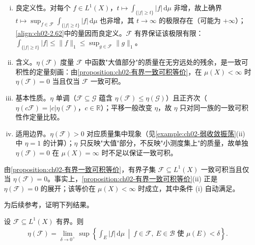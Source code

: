 \documentclass[../../main.tex]{subfiles}%
\begin{document}
\begin{remark}\label{remark:ch02-一致可积模}
\begin{enumerate}[(i)]
\item 良定义性。对每个 $f\in L^1(X)$，$t\mapsto\int_{\{|f|\geqslant t\}}|f|\,\mathrm{d}\mu$ 非增，故上确界 $t\mapsto\sup_{f\in\mathscr F}\int_{\{|f|\geqslant t\}}|f|\,\mathrm{d}\mu$ 也非增，其 $t\to\infty$ 的极限存在（可能为 $+\infty$）；\eqref{align:ch02-2.62}中的量因而良定义。$\mathscr F$ 有界保证该极限有限：$\int_{\{|f|\geqslant t\}}|f|\leqslant\|f\|_1\leqslant\sup_{g\in\mathscr F}\|g\|_1$。
\item 含义。$\eta(\mathscr F)$ 度量 $\mathscr F$ 中函数"大值部分"的质量在无穷远处的残余，是一致可积性的定量刻画：由\cref{proposition:ch02-有界一致可积等价}，在 $\mu(X)<\infty$ 时 $\eta(\mathscr F)=0$ 当且仅当 $\mathscr F$ 一致可积。
\item 基本性质。$\eta$ 单调（$\mathscr F\subseteq\mathscr G$ 蕴含 $\eta(\mathscr F)\leqslant\eta(\mathscr G)$）且正齐次（$\eta(c\mathscr F)=|c|\eta(\mathscr F)$，$c\in\mathbb R$）；平移一般改变 $\eta$，故 $\eta$ 只对同一族的一致可积性作定量比较。
\item 适用边界。$\eta(\mathscr F)>0$ 对应质量集中现象（见\cref{example:ch02-弱收敛振荡}(ii) 中 $\eta=1$ 的计算）；$\eta$ 只反映"大值"部分，不反映"小测度集上"的质量，故单独 $\eta(\mathscr F)=0$ 在 $\mu(X)=\infty$ 时不足以保证一致可积。
\end{enumerate}
\end{remark}

\begin{remark}\label{remark:ch02-模零一致可积}
由\cref{proposition:ch02-有界一致可积等价}，有界子集 $\mathscr F\subseteq L^1(X)$ 一致可积当且仅当 $\eta(\mathscr F)=0$。事实上，\cref{proposition:ch02-有界一致可积等价}(ii) 正是 $\eta(\mathscr F)=0$ 的展开；该等价在 $\mu(X)<\infty$ 时成立，其中条件 (i) 自动满足。
\end{remark}

为后续参考，证明下列结果。

\begin{lemma}\label{lemma:ch02-一致可积模等价}
设 $\mathscr F\subseteq L^1(X)$ 有界。则
\begin{align}
\eta(\mathscr F)=\lim_{\delta\to0^+}\sup\left\{\int_E|f|\,\mathrm{d}\mu\ \middle|\ f\in\mathscr F,\ E\in\mathscr B\text{ 使 }\mu(E)<\delta\right\}. \label{align:ch02-2.63}
\end{align}
\end{lemma}
\end{document}
